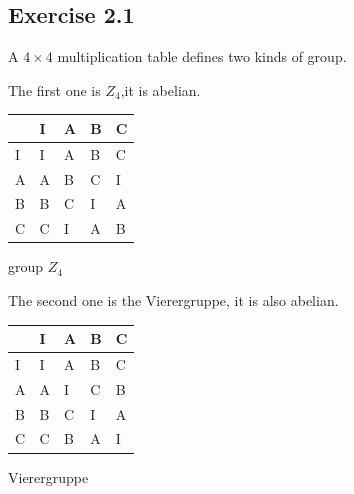 \documentclass[]{ctexart}
\begin{document}
    \subsection{Exercise 2.1}
    A $4 \times 4$ multiplication table defines two kinds of group.
    
    The first one is $Z_4$,it is abelian. 
    
    \begin{center}
    	\begin{tabular}{l|llll}
    		\cline{2-5}
    		& \multicolumn{1}{l|}{I} & \multicolumn{1}{l|}{A} & \multicolumn{1}{l|}{B} & \multicolumn{1}{l|}{C} \\ \hline
    		\multicolumn{1}{|l|}{I} & I                      & A                      & B                      & C                      \\ \cline{1-1}
    		\multicolumn{1}{|l|}{A} & A                      & B                      & C                      & I                      \\ \cline{1-1}
    		\multicolumn{1}{|l|}{B} & B                      & C                      & I                      & A                      \\ \cline{1-1}
    		\multicolumn{1}{|l|}{C} & C                      & I                      & A                      & B                      \\ \cline{1-1}
    	\end{tabular}
    \centerline{group $Z_4$}
    \end{center}\textbf{} 
    
    The second one is the Vierergruppe, it is also abelian.
    
    \begin{center}
    	\begin{tabular}{l|llll}
    		\cline{2-5}
    		& \multicolumn{1}{l|}{I} & \multicolumn{1}{l|}{A} & \multicolumn{1}{l|}{B} & \multicolumn{1}{l|}{C} \\ \hline
    		\multicolumn{1}{|l|}{I} & I                      & A                      & B                      & C                      \\ \cline{1-1}
    		\multicolumn{1}{|l|}{A} & A                      & I                      & C                      & B                      \\ \cline{1-1}
    		\multicolumn{1}{|l|}{B} & B                      & C                      & I                      & A                      \\ \cline{1-1}
    		\multicolumn{1}{|l|}{C} & C                      & B                      & A                      & I                      \\ \cline{1-1}
    	\end{tabular}
    \centerline{Vierergruppe}
    \end{center}
    
\end{document}
